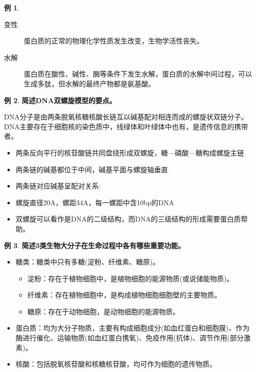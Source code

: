 \documentclass[UTF8]{article}
\theoremstyle{definition}
\newtheorem{example}{例}[section]
\begin{document}
\begin{example}
    \begin{description}
        \item[变性] 蛋白质的正常的物理化学性质发生改变，生物学活性丧失。
        \item[水解] 蛋白质在酸性、碱性、酶等条件下发生水解，蛋白质的水解中间过程，可以生成多肽，但水解的最终产物都是氨基酸。
    \end{description}
\end{example}\begin{example}\textbf{简述DNA双螺旋模型的要点。}
    
    DNA分子是由两条脱氧核糖核酸长链互以碱基配对相连而成的螺旋状双链分子。 DNA主要存在于细胞核的染色质中，线绿体和叶绿体中也有，是遗传信息的携带者。\begin{itemize}
        \item 两条反向平行的核苷酸链共同盘绕形成双螺旋，糖---磷酸---糖构成螺旋主链 \item 两条链的碱基都位于中间，碱基平面与螺旋轴垂直 \item 两条链对应碱基呈配对关系: \item 螺旋直径20A，螺距34A，每一螺距中含10bp的DNA\item 双螺旋可以看作是DNA的二级结构，而DNA的三级结构的形成需要蛋白质帮助。
    \end{itemize}
\end{example}\begin{example}\textbf{简述3类生物大分子在生命过程中各有哪些重要功能。}
    
    \begin{itemize}
        \item 糖类：糖类中只有多糖(淀粉、纤维素、糖原)。\begin{itemize}
            \item 淀粉：存在于植物细胞中，是植物细胞的能源物质(或说储能物质)。
            \item 纤维素：存在植物细胞中，是构成植物细胞细胞壁的主要物质。
            \item 糖原：存在于动物细胞，是动物细胞的能源物质。
        \end{itemize}
        \item 蛋白质：均为大分子物质，主要有构成细胞成分(如血红蛋白和细胞膜)、作为酶进行催化、运输物质(如血红蛋白携氧)、免疫作用(抗体)、调节作用(部分激素)。
        \item 核酸：包括脱氧核苷酸和核糖核苷酸，均可作为细胞的遗传物质。
    \end{itemize}
\end{example}
\end{document}
